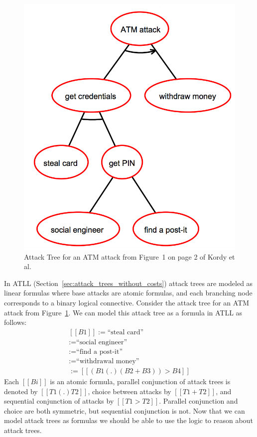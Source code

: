 \begin{figure}
  \vspace{-30px}
  \begin{center}
    \includegraphics[scale=0.225]{ATM-Tree1}
  \end{center}  
  \label{fig:atm-tree1}
  \caption{Attack Tree for an ATM attack from Figure~1 on page 2 of Kordy et al.~\cite{?}}
  \vspace{-55px}
\end{figure}
In ATLL (Section~\ref{sec:attack_trees_without_costs}) attack trees
are modeled as linear formulas where base attacks are atomic formulas,
and each branching node corresponds to a binary logical connective.
Consider the attack tree for an ATM attack from
Figure~\ref{fig:atm-tree1}.  We can model this attack tree as a
formula in ATLL as follows:
\[
\begin{array}{lll}
  [[B1]] := \text{``steal card''}\\
  [[B2]] := \text{``social engineer''}\\
  [[B3]] := \text{``find a post-it''}\\
  [[B4]] := \text{``withdrawal money''}\\
  [[T1]] := [[(B1 (.) (B2 + B3)) > B4]]
\end{array}
\]
Each $[[Bi]]$ is an atomic formula, parallel conjunction of attack
trees is denoted by $[[T1 (.) T2]]$, choice between attacks by $[[T1 +
    T2]]$, and sequential conjunction of attacks by $[[T1 > T2]]$.
Parallel conjunction and choice are both symmetric, but sequential
conjunction is not.  Now that we can model attack trees as formulas we
should be able to use the logic to reason about attack trees.

